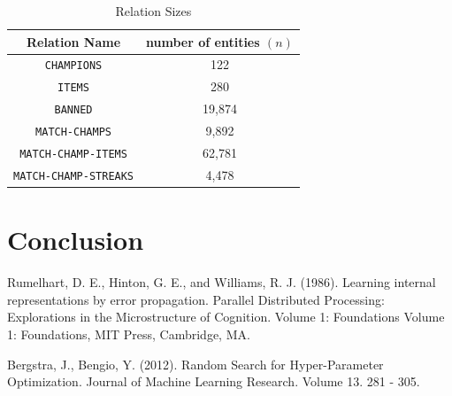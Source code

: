\documentclass[conference]{IEEEtran}
\begin{document}
\begin{table}[H]
  \caption{Relation Sizes}
  \resizebox{1.3\textwidth}{!} {\begin{minipage}{\textwidth}

      \begin{tabular}{ | c | c |}
        \hline
        Relation Name & number of entities $(n)$ \\ \hline
        \texttt{CHAMPIONS} & 122 \\
        \texttt{ITEMS} & 280 \\
        \texttt{BANNED} & 19,874 \\
        \texttt{MATCH-CHAMPS} & 9,892 \\
        \texttt{MATCH-CHAMP-ITEMS} & 62,781 \\
        \texttt{MATCH-CHAMP-STREAKS} & 4,478 \\ \hline
      \end{tabular}

      \label{table:sizeTable}
  \end{minipage} }
\end{table}

\section{Conclusion}


\begin{thebibliography}{1}

  Rumelhart, D. E., Hinton, G. E., and Williams, R. J. (1986). Learning internal representations by error propagation. Parallel Distributed Processing: Explorations in the Microstructure of Cognition. Volume 1: Foundations Volume 1: Foundations, MIT Press, Cambridge, MA.

  Bergstra, J., Bengio, Y. (2012). Random Search for Hyper-Parameter Optimization. Journal of Machine Learning Research. Volume 13. 281 - 305.
\end{thebibliography}
\end{document}
